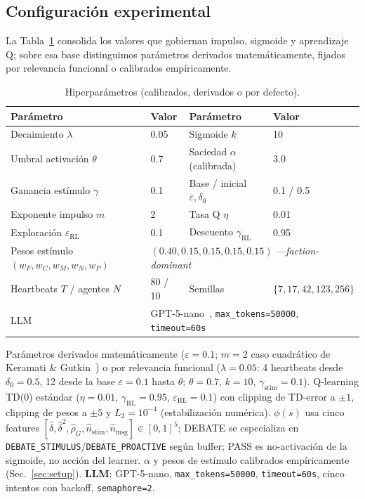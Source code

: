 \documentclass{llncs}
\begin{document}
\subsection{Configuraci\'on experimental}

La Tabla~\ref{tab:hyperparams} consolida los valores que gobiernan
impulso, sigmoide y aprendizaje Q; sobre esa base distinguimos par\'ametros
derivados matem\'aticamente, fijados por relevancia funcional o
calibrados emp\'iricamente.

\begin{table}
\caption{Hiperpar\'ametros (calibrados, derivados o por defecto).}\label{tab:hyperparams}
\centering\small
\begin{tabular}{|l|l|l|l|}
\hline
\textbf{Par\'ametro} & \textbf{Valor} & \textbf{Par\'ametro} & \textbf{Valor} \\
\hline
Decaimiento $\lambda$ & 0.05 & Sigmoide $k$ & 10 \\
Umbral activaci\'on $\theta$ & 0.7 & Saciedad $\alpha$ (calibrada) & 3.0 \\
Ganancia est\'imulo $\gamma$ & 0.1 & Base / inicial $\varepsilon,\delta_0$ & 0.1 / 0.5 \\
Exponente impulso $m$ & 2 & Tasa Q $\eta$ & 0.01 \\
Exploraci\'on $\varepsilon_{\text{RL}}$ & 0.1 & Descuento $\gamma_{\text{RL}}$ & 0.95 \\
Pesos est\'imulo $(w_F,w_C,w_M,w_N,w_P)$ & \multicolumn{3}{l|}{$(0.40, 0.15, 0.15, 0.15, 0.15)$ ---\emph{faction-dominant}} \\
Heartbeats $T$ / agentes $N$ & 80 / 10 & Semillas & $\{7,17,42,123,256\}$ \\
LLM & \multicolumn{3}{l|}{GPT-5-nano~\parencite{openai2025gpt5nano}, \texttt{max\_tokens=50000}, \texttt{timeout=60s}} \\
\hline
\end{tabular}
\end{table}

\noindent Par\'ametros derivados matem\'aticamente
($\varepsilon{=}0.1$; $m{=}2$ caso cuadr\'atico de Keramati \&
Gutkin~\cite{keramati2014homeostatic}) o por relevancia funcional
($\lambda{=}0.05$: 4 heartbeats desde $\delta_0{=}0.5$, 12 desde la base
$\varepsilon{=}0.1$ hasta $\theta$; $\theta{=}0.7$,
$k{=}10$, $\gamma_{\text{stim}}{=}0.1$). Q-learning TD(0) est\'andar
($\eta{=}0.01$, $\gamma_{\text{RL}}{=}0.95$, $\varepsilon_{\text{RL}}{=}0.1$)
con clipping de TD-error a $\pm 1$, clipping de pesos a $\pm 5$ y
$L_2{=}10^{-4}$ (estabilizaci\'on num\'erica). $\phi(s)$ usa cinco
features $[\hat\delta,\hat\delta^2,\hat\rho_G,\hat n_{\text{stim}},\hat n_{\text{msg}}]\in[0,1]^5$;
DEBATE se especializa en \texttt{DEBATE\_STIMULUS}/\texttt{DEBATE\_PROACTIVE}
seg\'un buffer; PASS es no-activaci\'on de la sigmoide, no acci\'on del
learner. $\alpha$ y pesos de est\'imulo calibrados emp\'iricamente
(Sec.~\ref{sec:setup}). \textbf{LLM}: GPT-5-nano, \texttt{max\_tokens=50000},
\texttt{timeout=60s}, cinco intentos con backoff, \texttt{semaphore=2}.
\end{document}
